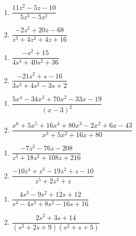 \documentclass{ximera}
\begin{document}
\begin{multicols}{2}
\begin{enumerate}
\setcounter{enumi}{\value{HW}}

\item $\dfrac{11z^{2} - 5z - 10}{5z^{3} - 5z^{2}}$
\item $\dfrac{-2z^{2} + 20z - 68}{z^{3} + 4z^{2} + 4z + 16}$

\setcounter{HW}{\value{enumi}}
\end{enumerate}
\end{multicols}

\begin{multicols}{2}
\begin{enumerate}
\setcounter{enumi}{\value{HW}}

\item $\dfrac{-s^{2} + 15}{4s^{4} + 40s^{2} + 36}$
\item $\dfrac{-21s^{2} + s - 16}{3s^{3} + 4s^{2} - 3s + 2}$


\setcounter{HW}{\value{enumi}}
\end{enumerate}
\end{multicols}

\begin{multicols}{2}
\begin{enumerate}
\setcounter{enumi}{\value{HW}}

\item $\dfrac{5x^{4} - 34x^{3} + 70x^{2} - 33x - 19}{(x - 3)^{2}}$
\item $\dfrac{x^{6} + 5x^{5} + 16x^{4} + 80x^{3} - 2x^{2} + 6x - 43}{x^{3} + 5x^{2} + 16x + 80}$


\setcounter{HW}{\value{enumi}}
\end{enumerate}
\end{multicols}

\begin{multicols}{2}
\begin{enumerate}
\setcounter{enumi}{\value{HW}}

\item $\dfrac{-7z^{2} - 76z - 208}{z^{3} + 18z^{2} + 108z + 216}$
\item $\dfrac{-10z^{4} + z^{3} - 19z^{2} + z - 10}{z^{5} + 2z^{3} + z}$


\setcounter{HW}{\value{enumi}}
\end{enumerate}
\end{multicols}

\begin{multicols}{2}
\begin{enumerate}
\setcounter{enumi}{\value{HW}}

\item $\dfrac{4s^{3} - 9s^{2} + 12s + 12}{s^{4} - 4s^{3} + 8s^{2} - 16s + 16}$
\item $\dfrac{2s^{2} + 3s + 14}{(s^{2} + 2s + 9)(s^{2} + s + 5)}$ \label{findparfraclast}

\setcounter{HW}{\value{enumi}}
\end{enumerate}
\end{multicols}
\end{document}
